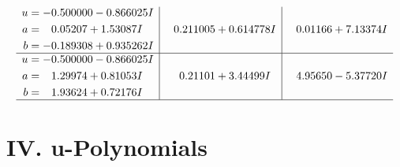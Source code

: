 \documentclass[1p]{elsarticle_modified}
\theoremstyle{definition}
\begin{document}
$$\begin{array}{c|c|c}
\begin{aligned}
u &= -0.500000 - 0.866025 I \\
a &= \phantom{-}0.05207 + 1.53087 I \\
b &= -0.189308 + 0.935262 I\end{aligned}
 & \phantom{-}0.211005 + 0.614778 I & \phantom{-}0.01166 + 7.13374 I \\ \hline\begin{aligned}
u &= -0.500000 - 0.866025 I \\
a &= \phantom{-}1.29974 + 0.81053 I \\
b &= \phantom{-}1.93624 + 0.72176 I\end{aligned}
 & \phantom{-}0.21101 + 3.44499 I & \phantom{-}4.95650 - 5.37720 I\\
 \hline 
 \end{array}$$\newpage
\newpage\renewcommand{\arraystretch}{1}
\centering \section*{ IV. u-Polynomials}
\end{document}
